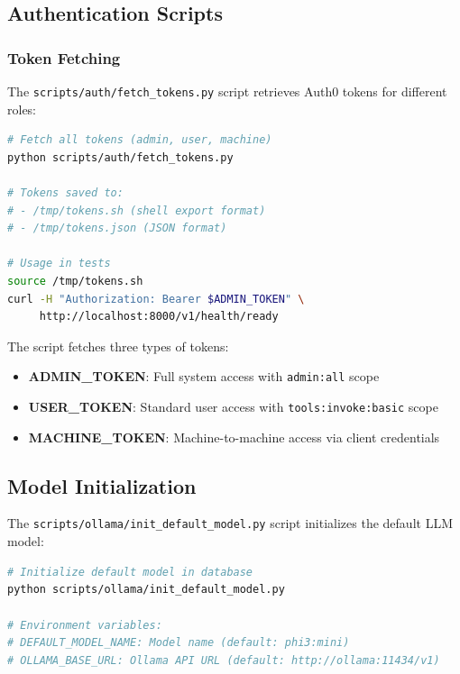 \subsection{Authentication Scripts}

\subsubsection{Token Fetching}

The \texttt{scripts/auth/fetch\_tokens.py} script retrieves Auth0 tokens for different roles:

\begin{lstlisting}[language=bash, caption=Token fetching script]
# Fetch all tokens (admin, user, machine)
python scripts/auth/fetch_tokens.py

# Tokens saved to:
# - /tmp/tokens.sh (shell export format)
# - /tmp/tokens.json (JSON format)

# Usage in tests
source /tmp/tokens.sh
curl -H "Authorization: Bearer $ADMIN_TOKEN" \
     http://localhost:8000/v1/health/ready
\end{lstlisting}

The script fetches three types of tokens:
\begin{itemize}
    \item \textbf{ADMIN\_TOKEN}: Full system access with \texttt{admin:all} scope
    \item \textbf{USER\_TOKEN}: Standard user access with \texttt{tools:invoke:basic} scope
    \item \textbf{MACHINE\_TOKEN}: Machine-to-machine access via client credentials
\end{itemize}

\subsection{Model Initialization}

The \texttt{scripts/ollama/init\_default\_model.py} script initializes the default LLM model:

\begin{lstlisting}[language=bash, caption=Model initialization script]
# Initialize default model in database
python scripts/ollama/init_default_model.py

# Environment variables:
# DEFAULT_MODEL_NAME: Model name (default: phi3:mini)
# OLLAMA_BASE_URL: Ollama API URL (default: http://ollama:11434/v1)
\end{lstlisting}


